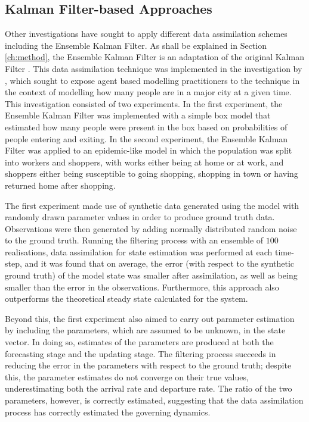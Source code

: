 \subsection{Kalman Filter-based Approaches}\label{sub:lit_rev:da_abm:kf}

Other investigations have sought to apply different data assimilation schemes
including the Ensemble Kalman Filter.
As shall be explained in Section \ref{ch:method}, the Ensemble Kalman Filter is an
adaptation of the original Kalman Filter \citep{evensen2003ensemble}.
This data assimilation technique was implemented in the investigation by
\citet{ward2016dynamic}, which sought to expose agent based modelling
practitioners to the technique in the context of modelling how many people are
in a major city at a given time.
This investigation consisted of two experiments.
In the first experiment, the Ensemble Kalman Filter was implemented with a
simple box model that estimated how many people were present in the box based on
probabilities of people entering and exiting.
In the second experiment, the Ensemble Kalman Filter was applied to an
epidemic-like model in which the population was split into workers and shoppers,
with works either being at home or at work, and shoppers either being
susceptible to going shopping, shopping in town or having returned home after
shopping.

The first experiment made use of synthetic data generated using the model with
randomly drawn parameter values in order to produce ground truth data.
Observations were then generated by adding normally distributed random noise to the
ground truth.
Running the filtering process with an ensemble of $100$ realisations, data
assimilation for state estimation was performed at each time-step, and it was
found that on average, the error (with respect to the synthetic ground truth) of
the model state was smaller after assimilation, as well as being smaller than
the error in the observations.
Furthermore, this approach also outperforms the theoretical steady state
calculated for the system.

Beyond this, the first experiment also aimed to carry out parameter estimation
by including the parameters, which are assumed to be unknown, in the state vector.
In doing so, estimates of the parameters are produced at both the forecasting
stage and the updating stage.
The filtering process succeeds in reducing the error in the parameters with
respect to the ground truth; despite this, the parameter estimates do not
converge on their true values, underestimating both the arrival rate and
departure rate.
The ratio of the two parameters, however, is correctly estimated, suggesting
that the data assimilation process has correctly estimated the governing
dynamics.

